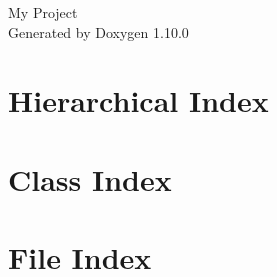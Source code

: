 \documentclass[twoside]{book}
\newcommand{\+}{\discretionary{\mbox{\scriptsize$\hookleftarrow$}}{}{}}
\newcommand{\clearemptydoublepage}{%
    \newpage{\pagestyle{empty}\cleardoublepage}%
  }
\begin{document}
  \raggedbottom
    \hypersetup{pageanchor=false,
                bookmarksnumbered=true,
                pdfencoding=unicode
               }
  \begin{titlepage}
  \vspace*{7cm}
  \begin{center}%
  {\Large My Project}\\
  \vspace*{1cm}
  {\large Generated by Doxygen 1.10.0}\\
  \end{center}
  \end{titlepage}
  \clearemptydoublepage
  \tableofcontents
  \clearemptydoublepage
  \hypersetup{pageanchor=true}

\chapter{Hierarchical Index}

\chapter{Class Index}

\chapter{File Index}

\end{document}
